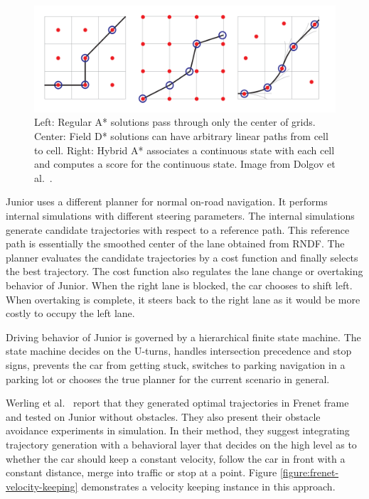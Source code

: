 \begin{figure}[h]
  \centering
  \includegraphics[width=.8\textwidth]{figures/hybridastar-comparison.png}
  \caption[A*, Field D* and Hybrid A* algorithms]{Left: Regular A* solutions
    pass through only the center of grids. Center: Field D* solutions can
    have arbitrary linear paths from cell to cell. Right: Hybrid A* associates
    a continuous state with each cell and computes a score for the continuous
    state. Image from Dolgov et al.\ \cite{Dolgov2010PathPF}.}
  \label{figure:hybridastar-comparison}
\end{figure}

Junior uses a different planner for normal on-road navigation. It performs
internal simulations with different steering parameters. The internal
simulations generate candidate trajectories with respect to a reference path.
This reference path is essentially the smoothed center of the lane obtained
from RNDF. The planner evaluates the candidate trajectories by a cost function
and finally selects the best trajectory. The cost function also regulates the
lane change or overtaking behavior of Junior. When the right lane is blocked,
the car chooses to shift left. When overtaking is complete, it steers back
to the right lane as it would be more costly to occupy the left lane.

Driving behavior of Junior is governed by a hierarchical finite state machine.
The state machine decides on the U-turns, handles intersection precedence and
stop signs, prevents the car from getting stuck, switches to parking navigation
in a parking lot or chooses the true planner for the current scenario in
general.

Werling et al.\ \cite{Werling2010OptimalTG} report that they generated optimal
trajectories in Frenet frame and tested on Junior without obstacles. They
also present their obstacle avoidance experiments in simulation. In their
method, they suggest integrating trajectory generation with a behavioral layer
that decides on the high level as to whether the car should keep a constant
velocity, follow the car in front with a constant distance, merge into
traffic or stop at a point. Figure \ref{figure:frenet-velocity-keeping}
demonstrates a velocity keeping instance in this approach.

